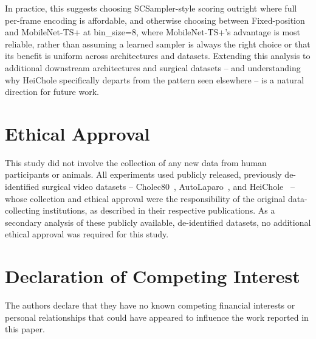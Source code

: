 \documentclass[preprint,12pt]{elsarticle}
\begin{document}
In practice, this suggests choosing SCSampler-style scoring outright where full per-frame encoding is affordable, and otherwise choosing between Fixed-position and MobileNet-TS+ at bin\_size=8, where MobileNet-TS+'s advantage is most reliable, rather than assuming a learned sampler is always the right choice or that its benefit is uniform across architectures and datasets. Extending this analysis to additional downstream architectures and surgical datasets -- and understanding why HeiChole specifically departs from the pattern seen elsewhere -- is a natural direction for future work.


\section*{Ethical Approval}
This study did not involve the collection of any new data from human participants or animals. All experiments used publicly released, previously de-identified surgical video datasets -- Cholec80~\cite{twinanda2017endonet}, AutoLaparo~\cite{wang2022autolaparo}, and HeiChole~\cite{wagner2023heichole} -- whose collection and ethical approval were the responsibility of the original data-collecting institutions, as described in their respective publications. As a secondary analysis of these publicly available, de-identified datasets, no additional ethical approval was required for this study.

\section*{Declaration of Competing Interest}
The authors declare that they have no known competing financial interests or personal relationships that could have appeared to influence the work reported in this paper.
\end{document}
